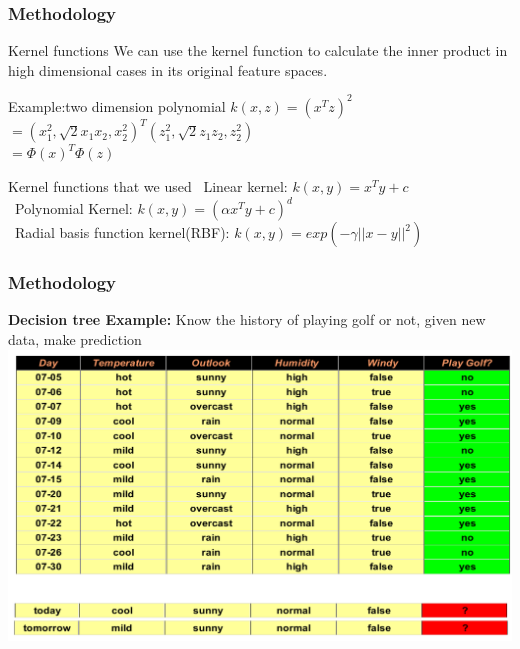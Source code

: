 \documentclass[xcolor={x11names,svgnames,dvipsnames}]{beamer}
\begin{document}
\begin{frame}
\frametitle{Methodology}
\begin{block}{Kernel functions}
We can use the kernel function to calculate the inner product in high dimensional cases in its original feature spaces.
\end{block}
\begin{block}{Example:two dimension polynomial}
$k(x,z)=(x^Tz)^2$\\
$=(x_1^2,\sqrt{2}x_1x_2,x_2^2)^T(z_1^2,\sqrt{2}z_1z_2,z_2^2)$\\
$=\Phi(x)^T\Phi(z)$\\
\end{block}
\begin{block}{Kernel functions that we used}
\small{
\textbullet\ {Linear kernel:  $k(x,y)=x^Ty+c$}\\
\textbullet\ {Polynomial Kernel:  $k(x,y)=(\alpha x^Ty+c)^d$}\\
\textbullet\ {Radial basis function kernel(RBF):  $k(x,y)=exp(-\gamma||x-y||^2)$}
}
\end{block}
\end{frame}

\begin{frame}
\frametitle{Methodology}
\textbf{Decision tree Example:}
Know the history of playing golf or not, given new data, make prediction\\ 
      \includegraphics[width=1\textwidth, height=0.7\textheight]{decision_tree1.png}
\end{frame}
\end{document}

